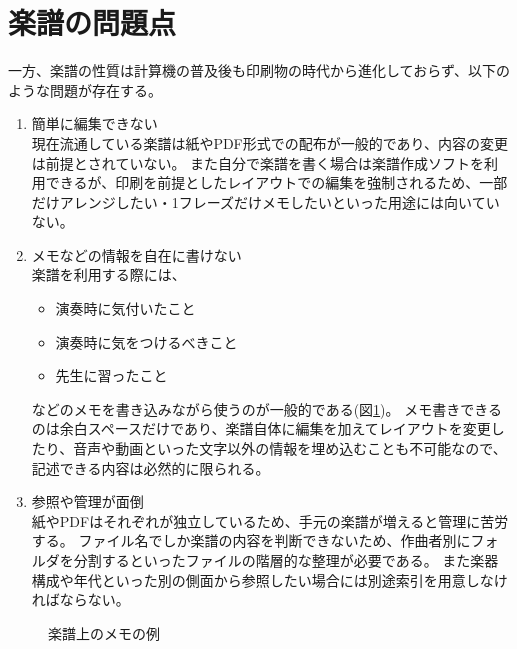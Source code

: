 \section{楽譜の問題点}
\label{mondai}
一方、楽譜の性質は計算機の普及後も印刷物の時代から進化しておらず、以下のような問題が存在する。
\begin{enumerate}
    \item 簡単に編集できない\\
    現在流通している楽譜は紙やPDF形式での配布が一般的であり、内容の変更は前提とされていない。
    また自分で楽譜を書く場合は楽譜作成ソフトを利用できるが、印刷を前提としたレイアウトでの編集を強制されるため、一部だけアレンジしたい・1フレーズだけメモしたいといった用途には向いていない。
    \item メモなどの情報を自在に書けない\\
    楽譜を利用する際には、
    \begin{itemize}
        \item 演奏時に気付いたこと
        \item 演奏時に気をつけるべきこと
        \item 先生に習ったこと
    \end{itemize}などのメモを書き込みながら使うのが一般的である(図\ref{memo})。
    メモ書きできるのは余白スペースだけであり、楽譜自体に編集を加えてレイアウトを変更したり、音声や動画といった文字以外の情報を埋め込むことも不可能なので、記述できる内容は必然的に限られる。
    \item 参照や管理が面倒\\
    紙やPDFはそれぞれが独立しているため、手元の楽譜が増えると管理に苦労する。
    ファイル名でしか楽譜の内容を判断できないため、作曲者別にフォルダを分割するといったファイルの階層的な整理が必要である。
    また楽器構成や年代といった別の側面から参照したい場合には別途索引を用意しなければならない。
\end{enumerate}

\begin{figure}[H]
    \centering
    \caption{楽譜上のメモの例}
    \label{memo}
\end{figure}

